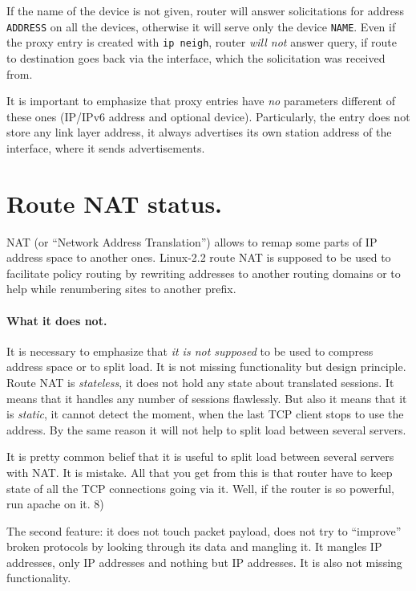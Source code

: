 If the name of the device is not given, router will answer solicitations
for address \verb|ADDRESS| on all the devices, otherwise it will serve
only the device \verb|NAME|. Even if the proxy entry is created with
\verb|ip neigh|, router {\em will not\/} answer query, if route
to destination goes back via the interface, which the solicitation
was received from.

It is important to emphasize that proxy entries have {\em no\/}
parameters different of these ones (IP/IPv6 address and optional device).
Particularly, the entry does not store any link layer address,
it always advertises its own station address of the interface,
where it sends advertisements.

\section{Route NAT status.}
\label{ROUTE-NAT}

NAT (or ``Network Address Translation'') allows to remap some parts
of IP address space to another ones. Linux-2.2 route NAT is supposed
to be used to facilitate policy routing by rewriting addresses
to another routing domains or to help while renumbering sites
to another prefix.

\paragraph{What it does not.}
It is necessary to emphasize that {\em it is not supposed\/}
to be used to compress address space or to split load.
It is not missing functionality but design principle.
Route NAT is {\em stateless\/}, it does not hold any state
about translated sessions. It means that it handles any number
of sessions flawlessly. But also it means that it is {\em static\/},
it cannot detect the moment, when the last TCP client stops
to use the address. By the same reason it will not help to split
load between several servers.
\begin{NB}
It is pretty common belief that it is useful to split load between
several servers with NAT. It is mistake. All that you get from this
is that router have to keep state of all the TCP connections going
via it. Well, if the router is so powerful, run apache on it. 8)
\end{NB}

The second feature: it does not touch packet payload,
does not try to ``improve'' broken protocols by looking
through its data and mangling it. It mangles IP addresses,
only IP addresses and nothing but IP addresses.
It is also not missing functionality.

